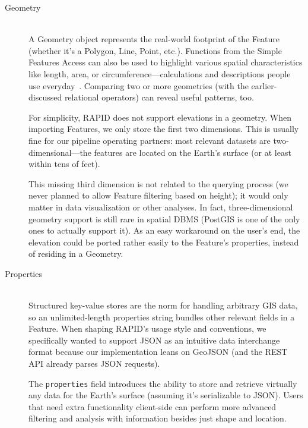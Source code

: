 \begin{description}
  \item[Geometry] \hfill \\
  A Geometry object represents the real-world footprint of the Feature (whether it's a Polygon, Line, Point, etc.). Functions from the Simple Features Access can also be used to highlight various spatial characteristics like length, area, or circumference---calculations and descriptions people use everyday~\cite{SFA}. Comparing two or more geometries (with the earlier-discussed relational operators) can reveal useful patterns, too.
   
   For simplicity, RAPID does not support elevations in a geometry. When importing Features, we only store the first two dimensions. This is usually fine for our pipeline operating partners: most relevant datasets are two-dimensional---the features are located on the Earth's surface (or at least within tens of feet).
   
   This missing third dimension is not related to the querying process (we never planned to allow Feature filtering based on height); it would only matter in data visualization or other analyses. In fact, three-dimensional geometry support is still rare in spatial DBMS (PostGIS is one of the only ones to actually support it). As an easy workaround on the user's end, the elevation could be ported rather easily to the Feature's properties, instead of residing in a Geometry.
  
  \item[Properties] \hfill \\
  Structured key-value stores are the norm for handling arbitrary GIS data, so an unlimited-length properties string bundles other relevant fields in a Feature. When shaping RAPID's usage style and conventions, we specifically wanted to support JSON as an intuitive data interchange format because our implementation leans on GeoJSON (and the REST API already parses JSON requests).
  
  The \texttt{properties} field introduces the ability to store and retrieve virtually any data for the Earth's surface (assuming it's serializable to JSON). Users that need extra functionality client-side can perform more advanced filtering and analysis with information besides just shape and location.
  

\end{description}
